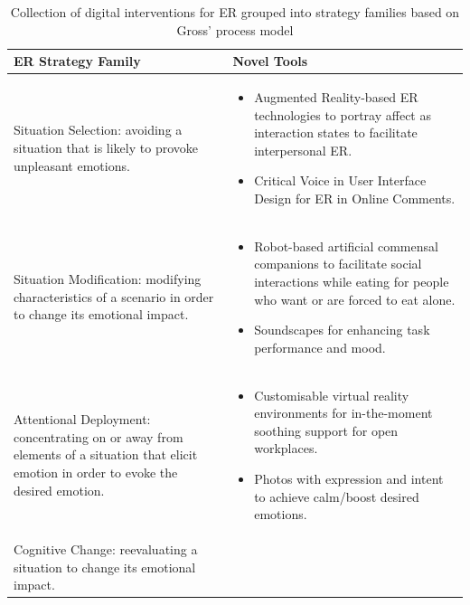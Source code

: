 \documentclass[lettersize,journal]{IEEEtran}
\begin{document}
\begin{table}[]
\centering
\caption{Collection of digital interventions for ER grouped into strategy families based on Gross' process model \cite{smith2022digital}}
\label{tab:my-table}
\begin{tabular}{m{2.7cm}m{5cm}}
\textbf{ER Strategy Family}                                                                                                             & \textbf{Novel Tools}                                                                                                                                                                                                                                                       \\ \hline
Situation Selection: avoiding a situation that is likely to provoke unpleasant emotions.                                                 & \begin{itemize}
\item Augmented Reality-based ER technologies to portray affect as interaction states to facilitate interpersonal ER.
\item Critical Voice in User Interface Design for ER in Online Comments.
\end{itemize}                             \\ \hline
Situation Modification: modifying characteristics of a scenario in order to change its emotional impact.                                 & \begin{itemize}
\item Robot-based artificial commensal companions to facilitate social interactions while eating for people who want or are forced to eat alone. 
\item Soundscapes for enhancing task performance and mood.
\end{itemize}                 \\ \hline
Attentional Deployment: concentrating on or away from elements of a situation that elicit emotion in order to evoke the desired emotion. & \begin{itemize}
\item Customisable virtual reality environments for in-the-moment soothing support for open workplaces.
\item Photos with expression and intent to achieve calm/boost desired emotions.
\end{itemize}                                       \\ \hline
Cognitive Change: reevaluating a situation to change its emotional impact.                                                               & \begin{itemize}

\end{itemize}
\end{tabular}
\end{table}
\end{document}
